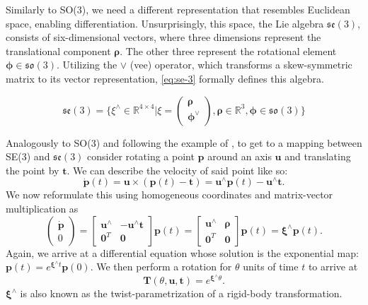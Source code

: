 \documentclass[headsepline, hidelinks, footsepline, footinclude=false, oneside, fontsize=11pt, paper=a4, listof=totoc, bibliography=totoc]{scrbook}
\begin{document}
Similarly to SO(3), we need a different representation that resembles Euclidean space, enabling differentiation. Unsurprisingly, this space, the Lie algebra \(\mathfrak{se}(3)\), consists of six-dimensional vectors,
where three dimensions represent the translational component \(\boldsymbol{\rho}\). The other three represent the rotational element \(\boldsymbol{\phi} \in \mathfrak{so}(3)\).
Utilizing the \(\vee\) (vee) operator, which transforms a skew-symmetric matrix to its vector representation, \cref{eq:se-3} formally defines this algebra.

\begin{equation}
\label{eq:se-3}
\mathfrak{se}(3) = \{\xi^\wedge \in \mathbb{R}^{4 \times 4} | \xi = \begin{pmatrix}\boldsymbol{\rho} \\ \boldsymbol{\phi}^\vee\end{pmatrix}, \boldsymbol{\rho} \in \mathbb{R}^3, \boldsymbol{\phi} \in \mathfrak{so}(3)\}
\end{equation}

Analogously to SO(3) and following the example of \cite{murrayMathematicalIntroductionRobotic1994}, to get to a mapping between SE(3) and \(\mathfrak{se}(3)\) consider rotating a point \(\mathbf{p}\) 
around an axis \(\mathbf{u}\) and translating the point by \(\mathbf{t}\).
We can describe the velocity of said point like so:
\begin{equation}
 \dot{\mathbf{p}}(t) = \mathbf{u} \times (\mathbf{p}(t) - \mathbf{t}) = \mathbf{u}^\wedge \mathbf{p}(t) - \mathbf{u}^\wedge \mathbf{t}.
\end{equation}
We now reformulate this using homogeneous coordinates and matrix-vector multiplication as 
\begin{equation}
\begin{pmatrix}\dot{\mathbf{p}} \\ 0\end{pmatrix} = \begin{bmatrix}\mathbf{u}^\wedge & -\mathbf{u}^\wedge \mathbf{t} \\ \mathbf{0}^T & \mathbf{0} \end{bmatrix}\mathbf{p}(t) = \begin{bmatrix}\mathbf{u}^\wedge & \boldsymbol{\rho} \\ \mathbf{0}^T & \mathbf{0} \end{bmatrix}\mathbf{p}(t) = \boldsymbol{\xi}^\wedge \mathbf{p}(t).
\end{equation}
Again, we arrive at a differential equation whose solution is the exponential map: \(\mathbf{p}(t) = e^{\boldsymbol{\xi^\wedge} t}\mathbf{p}(0)\). We then perform a rotation for \(\theta\) units of time \(t\) to arrive at 
\begin{equation}
\mathbf{T}(\theta, \mathbf{u}, \mathbf{t}) = e^{\boldsymbol{\xi}^\wedge\theta}.
\end{equation}
\(\boldsymbol{\xi}^\wedge\) is also known as the twist-parametrization of a rigid-body transformation.
\end{document}
